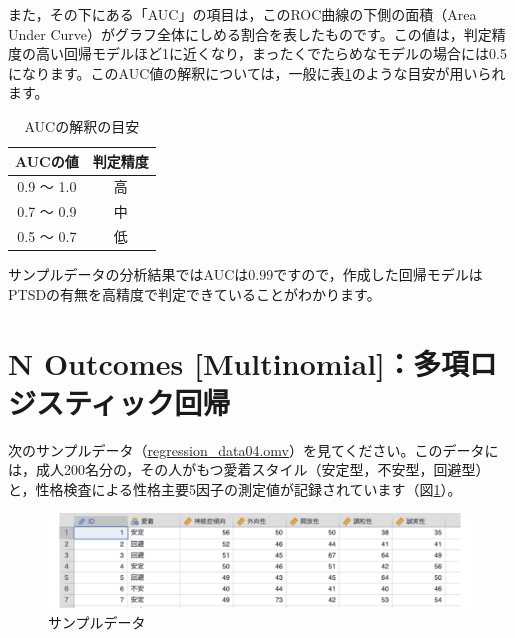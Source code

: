 \documentclass[
  12pt,
  a5jpaper,
  lualatex, ja=standard]{bxjsbook}
\begin{document}
また，その下にある「AUC」の項目は，このROC曲線の下側の面積（Area Under Curve）がグラフ全体にしめる割合を表したものです。この値は，判定精度の高い回帰モデルほど1に近くなり，まったくでたらめなモデルの場合には0.5になります。このAUC値の解釈については，一般に表\ref{tab:regression-binomial-auc-interpretation}のような目安が用いられます。

\begin{table}[H]

\caption{\label{tab:regression-binomial-auc-interpretation}AUCの解釈の目安}
\centering
\begin{tabular}[t]{cc}
\toprule
AUCの値 & 判定精度\\
\midrule
0.9 〜 1.0 & 高\\
0.7 〜 0.9 & 中\\
0.5 〜 0.7 & 低\\
\bottomrule
\end{tabular}
\end{table}

サンプルデータの分析結果ではAUCは0.99ですので，作成した回帰モデルはPTSDの有無を高精度で判定できていることがわかります。

\hypertarget{sec:regression-multinomial}{%
\section{N Outcomes {[}Multinomial{]}：多項ロジスティック回帰}\label{sec:regression-multinomial}}

次のサンプルデータ（\href{https://github.com/sbtseiji/jmv_compguide/raw/main/data/omv/regression_data04.omv}{regression\_data04.omv}）を見てください。このデータには，成人200名分の，その人がもつ愛着スタイル（安定型，不安型，回避型）と，性格検査による性格主要5因子の測定値が記録されています（図\ref{fig:regression-data04}）。

\begin{figure}[!ht]

{\centering \includegraphics[width=1\linewidth]{images/regression/data04} 

}

\caption{サンプルデータ}\label{fig:regression-data04}
\end{figure}
\end{document}
